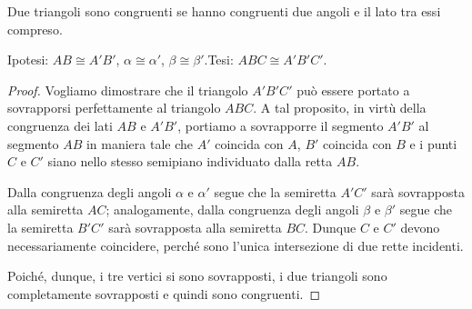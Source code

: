 \begin{teorema}
Due triangoli sono congruenti se hanno congruenti due angoli e il 
lato tra essi compreso.
\end{teorema}


\begin{inaccessibleblock}
 \begin{figure}[htb]
\centering
\end{figure}
\end{inaccessibleblock}

\noindent Ipotesi: $AB\cong A'B'$, $\alpha\cong \alpha'$, $\beta 
\cong \beta'$.\tab Tesi:  $ABC \cong A'B'C'$.

\begin{proof}
Vogliamo dimostrare che il triangolo $A'B'C'$ può essere portato a 
sovrapporsi perfettamente al triangolo $ABC$.
A tal proposito, in virtù della congruenza dei lati $AB$ e $A'B'$, 
portiamo a sovrapporre il segmento $A'B'$ al segmento $AB$ in maniera 
tale che $A'$ coincida con $A$, $B'$ coincida con $B$ e i punti $C$ e 
$C'$ siano nello stesso semipiano individuato dalla retta $AB$. 

Dalla congruenza degli angoli $\alpha$ e $\alpha'$ segue che la 
semiretta $A'C'$ sarà sovrapposta alla semiretta $AC$; analogamente, 
dalla congruenza degli angoli $\beta$ e $\beta'$ segue che la 
semiretta $B'C'$ sarà sovrapposta alla semiretta $BC$. Dunque $C$ e 
$C'$ devono necessariamente coincidere, perché sono l'unica 
intersezione di due rette incidenti.

Poiché, dunque, i tre vertici si sono sovrapposti, i due triangoli 
sono completamente sovrapposti e quindi sono congruenti.
\end{proof}

